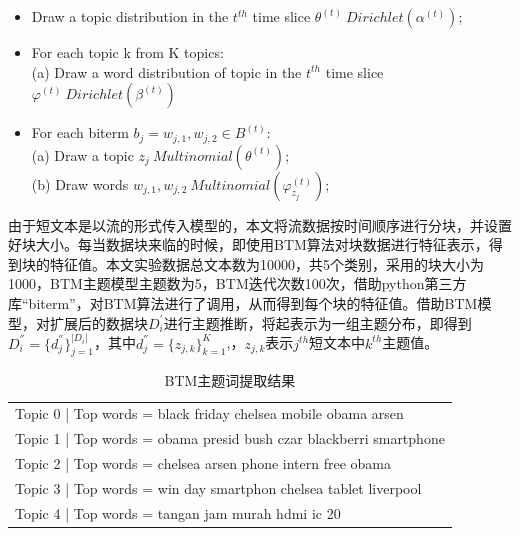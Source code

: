 \begin{center}
  \begin{itemize}
\item Draw a topic distribution in the $t^{th}$ time slice $\theta^{(t)}~Dirichlet(\alpha^{(t)})$;
\item For each topic k from K topics:\\
        (a) Draw a word distribution of topic in the $t^{th}$ time slice $\varphi^{(t)}~Dirichlet(\beta^{(t)})$
      \item For each biterm $b_j = {w_{j,1},w_{j,2}} \in B^{(t)}$:\\
        (a) Draw a topic $z_j ~ Multinomial(\theta^{(t)})$;\\
        (b) Draw words $w_{j,1},w_{j,2} ~ Multinomial(\varphi_{z_{j}}^{(t)})$;\\
 \end{itemize}
\end{center}

由于短文本是以流的形式传入模型的，本文将流数据按时间顺序进行分块，并设置好块大小。每当数据块来临的时候，即使用BTM算法对块数据进行特征表示，得到块的特征值。本文实验数据总文本数为10000，共5个类别，采用的块大小为1000，BTM主题模型主题数为5，BTM迭代次数100次，借助python第三方库“biterm”，对BTM算法进行了调用，从而得到每个块的特征值。借助BTM模型，对扩展后的数据块$D_i^{'}$进行主题推断，将起表示为一组主题分布，即得到$D_i^{''}=\{d_j^{''}\}_{j=1}^{|D_i|}$，其中$d_j^{''}=\{z_{j,k}\}_{k=1}^K$,，$z_{j,k}$表示$j^{th}$短文本中$k^{th}$主题值。

\begin{table}[htb]
  \begin{singlespace}                                                          
    \centering\caption{BTM主题词提取结果}\label{tab:before}
    \renewcommand{\arraystretch}{1.5} %
    \begin{tabular}{l}\hline
Topic 0 | Top words = black friday chelsea mobile obama arsen \\
Topic 1 | Top words = obama presid bush czar blackberri smartphone \\
Topic 2 | Top words = chelsea arsen phone intern free obama \\
Topic 3 | Top words = win day smartphon chelsea tablet liverpool \\ 
Topic 4 | Top words = tangan jam murah hdmi ic 20 \\ 
\hline                                                      
     \end{tabular}                                                              
  \end{singlespace}
\end{table}               

